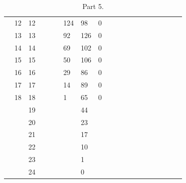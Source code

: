 \documentclass[12pt]{article}
\begin{document}
\begin{table}[h]
\begin{tabular}{l|l|l|l|l|l|l|l|l|l|llllllllll}
                   & 12      & 12      &         &        &  & 124       & 98        & 0         &          &  &  &  &  &  &  &  &  &  &  \\ \cline{2-10}
                   & 13      & 13      &         &        &  & 92        & 126       & 0         &          &  &  &  &  &  &  &  &  &  &  \\ \cline{2-10}
                   & 14      & 14      &         &        &  & 69        & 102       & 0         &          &  &  &  &  &  &  &  &  &  &  \\ \cline{2-10}
                   & 15      & 15      &         &        &  & 50        & 106       & 0         &          &  &  &  &  &  &  &  &  &  &  \\ \cline{2-10}
                   & 16      & 16      &         &        &  & 29        & 86        & 0         &          &  &  &  &  &  &  &  &  &  &  \\ \cline{2-10}
                   & 17      & 17      &         &        &  & 14        & 89        & 0         &          &  &  &  &  &  &  &  &  &  &  \\ \cline{2-10}
                   & 18      & 18      &         &        &  & 1         & 65        & 0         &          &  &  &  &  &  &  &  &  &  &  \\ \cline{2-10}
                   &         & 19      &         &        &  &           & 44        &           &          &  &  &  &  &  &  &  &  &  &  \\ \cline{2-10}
                   &         & 20      &         &        &  &           & 23        &           &          &  &  &  &  &  &  &  &  &  &  \\ \cline{2-10}
                   &         & 21      &         &        &  &           & 17        &           &          &  &  &  &  &  &  &  &  &  &  \\ \cline{2-10}
                   &         & 22      &         &        &  &           & 10        &           &          &  &  &  &  &  &  &  &  &  &  \\ \cline{2-10}
                   &         & 23      &         &        &  &           & 1         &           &          &  &  &  &  &  &  &  &  &  &  \\ \cline{2-10}
                   &         & 24      &         &        &  &           & 0         &           &          &  &  &  &  &  &  &  &  &  &  \\ \cline{2-10}
\end{tabular}
\caption{Part 5.}
\end{table}
\end{document}
